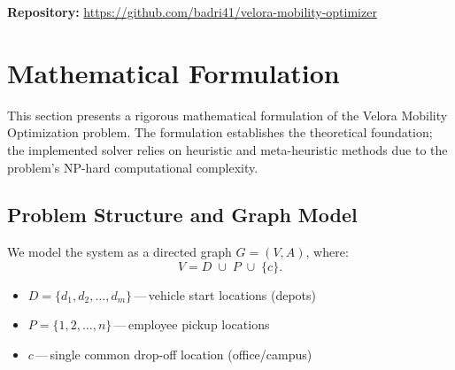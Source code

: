 \documentclass[11pt,a4paper]{article}
\begin{document}
\newpage
\thispagestyle{empty}

\vspace*{-0.6cm}

\begin{tcolorbox}[
    enhanced,
    colback=vellight,
    colframe=velblue,
    boxrule=0.6pt,
    arc=3pt,
    width=\textwidth,
    halign=center,
    top=8pt, bottom=8pt
]
\centering
\textbf{\color{velblue}Repository:}\quad
\url{https://github.com/badri41/velora-mobility-optimizer}
\end{tcolorbox}

\vspace{0.4cm}

\tableofcontents

\newpage

\section{Mathematical Formulation}

This section presents a rigorous mathematical formulation of the Velora Mobility Optimization problem. The formulation establishes the theoretical foundation; the implemented solver relies on heuristic and meta-heuristic methods due to the problem's NP-hard computational complexity.

\subsection{Problem Structure and Graph Model}

We model the system as a directed graph $G = (V, A)$, where:
\[
V = D \;\cup\; P \;\cup\; \{c\}.
\]

\begin{instancebox}
\begin{itemize}[nosep, leftmargin=1.2em]
    \item $D = \{d_1, d_2, \dots, d_m\}$\,---\,vehicle start locations (depots)
    \item $P = \{1, 2, \dots, n\}$\,---\,employee pickup locations
    \item $c$\,---\,single common drop-off location (office/campus)
\end{itemize}
\end{instancebox}
\end{document}
